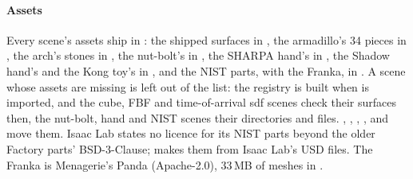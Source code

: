 \paragraph{Assets} Every scene's assets ship in : the shipped surfaces in , the armadillo's 34 pieces in , the arch's stones in , the nut-bolt's in , the SHARPA hand's in , the Shadow hand's and the Kong toy's in , and the NIST parts, with the Franka, in . A scene whose assets are missing is left out of the list: the registry is built when  is imported, and the cube, FBF and time-of-arrival sdf scenes check their surfaces then, the nut-bolt, hand and NIST scenes their directories and files. , , , ,  and  move them. Isaac Lab states no licence for its NIST parts beyond the older Factory parts' BSD-3-Clause;  makes them from Isaac Lab's USD files. The Franka is Menagerie's Panda (Apache-2.0), 33\,MB of meshes in .

